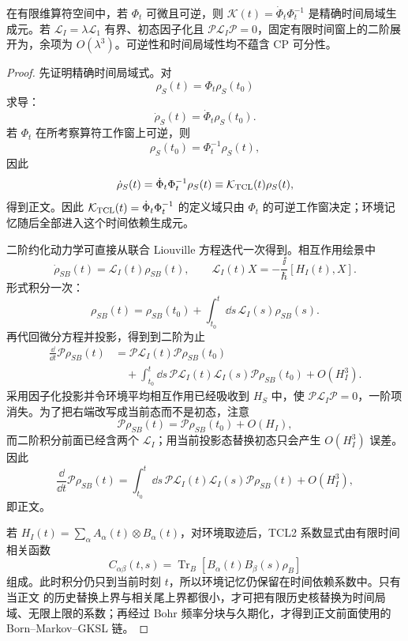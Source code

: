 \begin{proposition}
在有限维算符空间中，若 $\Phi_t$ 可微且可逆，则 $\mathcal K(t)=\dot\Phi_t\Phi_t^{-1}$ 是精确时间局域生成元。若 $\mathcal L_I=\lambda\mathcal L_1$ 有界、初态因子化且 $\mathcal P\mathcal L_I\mathcal P=0$，固定有限时间窗上的二阶展开为，余项为 $O(\lambda^3)$。可逆性和时间局域性均不蕴含 CP 可分性。
\end{proposition}
\begin{proof}
先证明精确时间局域式。对
\[
\rho_S(t)=\Phi_t\rho_S(t_0)
\]
求导：
\[
\dot\rho_S(t)=\dot\Phi_t\rho_S(t_0).
\]
若 $\Phi_t$ 在所考察算符工作窗上可逆，则
\[
\rho_S(t_0)=\Phi_t^{-1}\rho_S(t),
\]
因此
\[
\dot\rho_S(t)
=\dot\Phi_t\Phi_t^{-1}\rho_S(t)
\equiv\mathcal K_{\rm TCL}(t)\rho_S(t),
\]
得到正文。因此 $\mathcal K_{\rm TCL}(t)=\dot\Phi_t\Phi_t^{-1}$ 的定义域只由 $\Phi_t$ 的可逆工作窗决定；环境记忆随后全部进入这个时间依赖生成元。

二阶约化动力学可直接从联合 Liouville 方程迭代一次得到。相互作用绘景中
\[
\dot\rho_{SB}(t)=\mathcal L_I(t)\rho_{SB}(t),
\qquad
\mathcal L_I(t)X=-\frac{\ii}{\hbar}[H_I(t),X].
\]
形式积分一次：
\[
\rho_{SB}(t)
=\rho_{SB}(t_0)
+\int_{t_0}^{t}\dd s\,\mathcal L_I(s)\rho_{SB}(s).
\]
再代回微分方程并投影，得到到二阶为止
\begin{align*}
\frac{\dd}{\dd t}\mathcal P\rho_{SB}(t)
&=\mathcal P\mathcal L_I(t)\mathcal P\rho_{SB}(t_0)\\
&\quad+\int_{t_0}^{t}\dd s\,
\mathcal P\mathcal L_I(t)\mathcal L_I(s)
\mathcal P\rho_{SB}(t_0)
+O(H_I^3).
\end{align*}
采用因子化投影并令环境平均相互作用已经吸收到 $H_S$ 中，使
$\mathcal P\mathcal L_I\mathcal P=0$，一阶项消失。为了把右端改写成当前态而不是初态，注意
\[
\mathcal P\rho_{SB}(t)
=\mathcal P\rho_{SB}(t_0)+O(H_I),
\]
而二阶积分前面已经含两个 $\mathcal L_I$；用当前投影态替换初态只会产生 $O(H_I^3)$ 误差。因此
\[
\frac{\dd}{\dd t}\mathcal P\rho_{SB}(t)
=\int_{t_0}^{t}\dd s\,
\mathcal P\mathcal L_I(t)\mathcal L_I(s)\mathcal P
\rho_{SB}(t)+O(H_I^3),
\]
即正文。

若 $H_I(t)=\sum_\alpha A_\alpha(t)\otimes B_\alpha(t)$，对环境取迹后，TCL2 系数显式由有限时间相关函数
\[
C_{\alpha\beta}(t,s)
=\operatorname{Tr}_B[B_\alpha(t)B_\beta(s)\rho_B]
\]
组成。此时积分仍只到当前时刻 $t$，所以环境记忆仍保留在时间依赖系数中。只有当正文 的历史替换上界与相关尾上界都很小，才可把有限历史核替换为时间局域、无限上限的系数；再经过 Bohr 频率分块与久期化，才得到正文前面使用的 Born--Markov--GKSL 链。
\end{proof}


